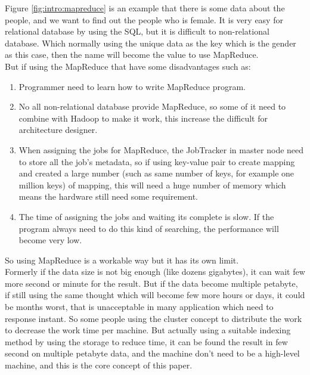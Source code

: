 Figure \ref{fig:intro:mapreduce} is an example that there is some data about the people, and we want to find out the people who is female. It is very easy for relational database by using the SQL, but it is difficult to non-relational database. Which normally using the unique data as the key which is the gender as this case, then the name will become the value to use MapReduce.\\

But if using the MapReduce that have some disadvantages such as:

\begin{enumerate}

\item Programmer need to learn how to write MapReduce program.

\item No all non-relational database provide MapReduce, so some of it need to combine with Hadoop to make it work, this increase the difficult for architecture designer.

\item When assigning the jobs for MapReduce, the JobTracker in master node need to store all the job's metadata, so if using key-value pair to create mapping and created a large number (such as same number of keys, for example one million keys) of mapping, this will need a huge number of memory which means the hardware still need some requirement.

\item The time of assigning the jobs and waiting its complete is slow. If the program always need to do this kind of searching, the performance will become very low.

\end{enumerate}

So using MapReduce is a workable way but it has its own limit.\\

Formerly if the data size is not big enough (like dozens gigabytes), it can wait few more second or minute for the result. But if the data become multiple petabyte, if still using the same thought which will become few more hours or days, it could be months worst, that is unacceptable in many application which need to response instant. So some people using the cluster concept to distribute the work to decrease the work time per machine. But actually using a suitable indexing method by using the storage to reduce time, it can be found the result in few second on multiple petabyte data, and the machine don't need to be a high-level machine, and this is the core concept of this paper.\\

